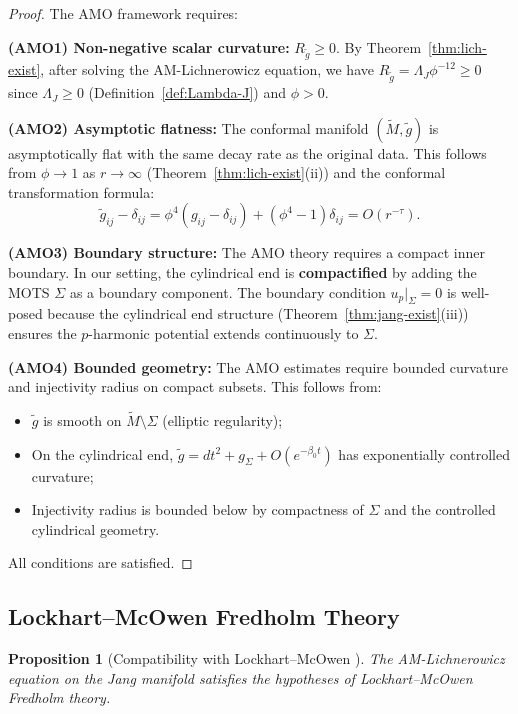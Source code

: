 \documentclass[12pt]{article}
\theoremstyle{plain}
\newtheorem{proposition}[theorem]{Proposition}
\theoremstyle{definition}
\theoremstyle{remark}
\newcommand{\tM}{\tilde{M}}
\newcommand{\tg}{\tilde{g}}
\begin{document}
\begin{proof}
The AMO framework requires:

\textbf{(AMO1) Non-negative scalar curvature:} $R_{\tg} \geq 0$. By Theorem~\ref{thm:lich-exist}, after solving the AM-Lichnerowicz equation, we have $R_{\tg} = \Lambda_J \phi^{-12} \geq 0$ since $\Lambda_J \geq 0$ (Definition~\ref{def:Lambda-J}) and $\phi > 0$.

\textbf{(AMO2) Asymptotic flatness:} The conformal manifold $(\tM, \tg)$ is asymptotically flat with the same decay rate as the original data. This follows from $\phi \to 1$ as $r \to \infty$ (Theorem~\ref{thm:lich-exist}(ii)) and the conformal transformation formula:
\[
\tg_{ij} - \delta_{ij} = \phi^4(g_{ij} - \delta_{ij}) + (\phi^4 - 1)\delta_{ij} = O(r^{-\tau}).
\]

\textbf{(AMO3) Boundary structure:} The AMO theory requires a compact inner boundary. In our setting, the cylindrical end is \textbf{compactified} by adding the MOTS $\Sigma$ as a boundary component. The boundary condition $u_p|_\Sigma = 0$ is well-posed because the cylindrical end structure (Theorem~\ref{thm:jang-exist}(iii)) ensures the $p$-harmonic potential extends continuously to $\Sigma$.

\textbf{(AMO4) Bounded geometry:} The AMO estimates require bounded curvature and injectivity radius on compact subsets. This follows from:
\begin{itemize}
    \item $\tg$ is smooth on $\tM \setminus \Sigma$ (elliptic regularity);
    \item On the cylindrical end, $\tg = dt^2 + g_\Sigma + O(e^{-\beta_0 t})$ has exponentially controlled curvature;
    \item Injectivity radius is bounded below by compactness of $\Sigma$ and the controlled cylindrical geometry.
\end{itemize}

All conditions are satisfied. \qedhere
\end{proof}

\subsection{Lockhart--McOwen Fredholm Theory}

\begin{proposition}[Compatibility with Lockhart--McOwen {\cite{lockhartmccowen1985}}]\label{prop:lm-compat}
The AM-Lichnerowicz equation on the Jang manifold satisfies the hypotheses of Lockhart--McOwen Fredholm theory.
\end{proposition}
\end{document}
